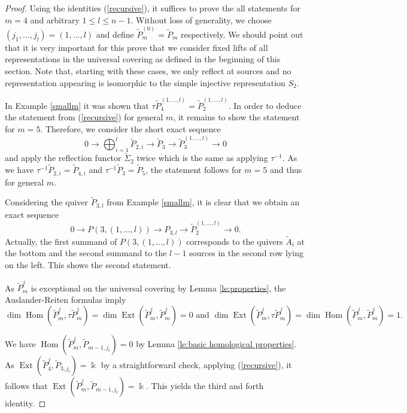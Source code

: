 \documentclass{amsart}
\newcommand{\uj}{\underline j}
\newcommand{\kk}{\Bbbk}
\newcommand{\Ext}{\operatorname{Ext}}
\newcommand{\Hom}{\operatorname{Hom}}
\newcommand{\ses}[3]{0\rightarrow #1\rightarrow #2\rightarrow#3\rightarrow 0}
\begin{document}
\begin{proof}
Using the identities (\ref{recursive}), it suffices to prove the all statements for $m=4$ and arbitrary $1\leq l\leq n-1$. Without loss of generality, we choose $(j_1,\ldots,j_l)=(1,\ldots,l)$ and define $\tilde P_m^{(0)}=\tilde P_m$ respectively. We should point out that it is very important for this prove that we consider fixed lifts of all representations in the universal covering as defined in the beginning of this section. Note that, starting with these cases, we only reflect at sources and no representation appearing is isomorphic to the simple injective representation $S_2$.  


In Example \ref{smallm} it was shown that $\tau \tilde P_4^{(1,\ldots,l)}=\tilde P_2^{(1,\ldots,l)}$. In order to deduce the statement from (\ref{recursive}) for general $m$, it remains to show the statement for $m=5$. Therefore, we consider the short exact sequence
\[\ses{\bigoplus_{i=1}^l\tilde P_{2,i}}{\tilde P_3}{\tilde P_3^{(1,\ldots,l)}}\]
and apply the reflection functor $\tilde\Sigma_2$ twice which is the same as applying $\tau^{-1}$. As we have $\tau^{-1} \tilde P_{2,i}=\tilde P_{4,i}$ and $\tau^{-1}\tilde P_3=\tilde P_5$, the statement follows for $m=5$ and thus for general $m$.

Considering the quiver $\tilde P_{3,l}$ from Example \ref{smallm}, it is clear that we obtain an exact sequence
$$\ses{P(3,(1,\ldots,l))}{P_{3,l}}{\tilde P_2^{(1,\ldots,l)}}.$$
Actually, the first summand of $P(3,(1,\ldots,l))$ corresponds to the quivers $\tilde A_i$ at the bottom and the second summand to the $l-1$ sources in the second row lying on the left. This shows the second statement.

As $\tilde P_m^{\uj}$ is exceptional on the universal covering by Lemma \ref{le:properties}, the Auslander-Reiten formulas \cite[Theorem IV.2.13]{ass} imply 
$$\dim\Hom(\tilde P_{m}^{\uj},\tau \tilde P_{m}^{\uj})=\dim\Ext(\tilde P_{m}^{\uj},\tilde P_{m}^{\uj})=0 \text{ and } \dim\Ext(\tilde P_m^{\uj},\tau\tilde P_m^{j})=\dim\Hom(\tilde P_{m}^{\uj},\tilde P_{m}^{\uj})=1.$$

We have $\Hom(\tilde P_{m}^{\uj},\tilde P_{m-1,j_l})=0$ by Lemma \ref{le:basic homological properties}. As $\Ext(\tilde P_{4}^{\uj},\tilde P_{3,j_l})=\kk$ by a straightforward check, applying (\ref{recursive}), it follows that $\Ext(\tilde P_{m}^{\uj},\tilde P_{m-1,j_l})=\kk$. This yields the third and forth identity.





\end{proof}
\end{document}
